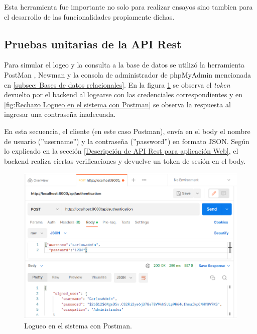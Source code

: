 Esta herramienta fue importante no solo para realizar ensayos sino tambien para el desarrollo de las funcionalidades propiamente dichas.

\pagebreak

\subsection{Pruebas unitarias de la API Rest}

Para simular el logeo y la consulta a la base de datos se utilizó la herramienta PostMan \citep{WEBSITE:30}, Newman \citep{WEBSITE:35} y la consola de administrador de phpMyAdmin mencionada en \ref{subsec: Bases de datos relacionales}. En la figura \ref{fig:Logueo en el sistema con Postman} se observa el \textit{token} devuelto por el backend al logearse con las credenciales correspondientes y en \ref{fig:Rechazo Logueo en el sistema con Postman} se observa la respuesta al ingresar una contraseña inadecuada.


En esta secuencia, el cliente (en este caso Postman), envía en el body el nombre de usuario (''username'') y la contraseña (''password'') en formato JSON. Según lo explicado en la sección  \ref{Descripción de API Rest para aplicación Web}, el backend realiza ciertas verificaciones y devuelve un token de sesión en el body.

\begin{figure}[ht]
	\centering
	\includegraphics[scale=.35]{./Figures/auth.png}
	\caption{Logueo en el sistema con Postman.}
	\label{fig:Logueo en el sistema con Postman}
\end{figure}

